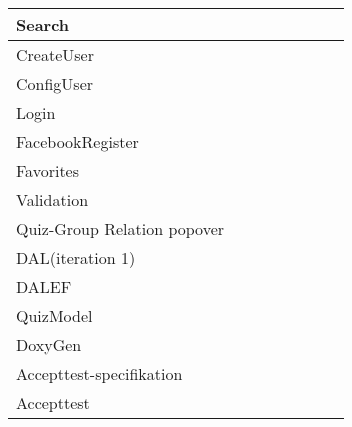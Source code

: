 \begin{tabular}{|l|c|c|c|c|c|c|c|}
Search		&\checkmark	&	&	&	& 	&\checkmark	& \\ 
\hline

CreateUser		&	&	&	&	& 	&	&\checkmark	 \\ 
\hline

ConfigUser 		&	&	&	&	& 	&\checkmark	& \\ 
\hline

Login		&	&	&\checkmark	&	& 	&	& \\ 
\hline

FacebookRegister 		&	&	&\checkmark	&	& 	&	& \\ 
\hline

Favorites		&	&	&	&	&\checkmark 	&	& \\ 
\hline

Validation 		&	&\checkmark	&\checkmark	&	& 	&	& \\ 
\hline

Quiz-Group Relation popover		&	&\checkmark	&	&	& 	&	& \\ 
\hline 

DAL(iteration 1)	&	&	&\checkmark	&	& 	&	& \\ 
\hline 

DALEF		&	&\checkmark	&\checkmark	&\checkmark	& 	&\checkmark	&\checkmark \\ 
\hline 

QuizModel		&	&\checkmark	&\checkmark	&	& 	&\checkmark	& \\ 
\hline 

DoxyGen		&	&	&	&\checkmark	& 	&	& \\ 
\hline 

\rowcolor{Gray}
Accepttest-specifikation		&\multicolumn{7}{c|}{ } \\ 
\hline

Accepttest 		&\checkmark &\checkmark	&\checkmark	&\checkmark	&\checkmark	&\checkmark	&\checkmark \\ 
\hline

\end{tabular} 

%

